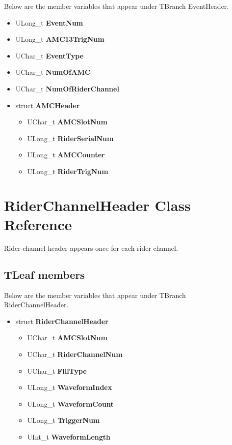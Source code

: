 \documentclass[12pt,letterpaper]{article}
\begin{document}
Below are the member variables that appear under TBranch EventHeader.

\begin{itemize}
\item ULong\_t \textbf{EventNum}
\item ULong\_t \textbf{AMC13TrigNum}
\item UChar\_t \textbf{EventType}
\item UChar\_t \textbf{NumOfAMC}
\item UChar\_t \textbf{NumOfRiderChannel}
\item struct \textbf{AMCHeader} 
    \begin{itemize}
    \item UChar\_t \textbf{AMCSlotNum}  
    \item ULong\_t  \textbf{RiderSerialNum}  
    \item ULong\_t \textbf{AMCCounter}
    \item ULong\_t \textbf{RiderTrigNum}
    \end{itemize} 
\end{itemize}

\newpage
\section{RiderChannelHeader Class Reference} 
Rider channel header appears once for each rider channel.

\subsection*{TLeaf members}

Below are the member variables that appear under TBranch RiderChannelHeader.

\begin{itemize}
\item struct \textbf{RiderChannelHeader}
      \begin{itemize}
    \item UChar\_t \textbf{AMCSlotNum}
    \item UChar\_t \textbf{RiderChannelNum}
    \item UChar\_t \textbf{FillType}
     \item ULong\_t \textbf{WaveformIndex}
    \item ULong\_t \textbf{WaveformCount}
    \item ULong\_t \textbf{TriggerNum}
    \item UInt\_t \textbf{WaveformLength}
    \end{itemize}
\end{itemize}
\end{document}
